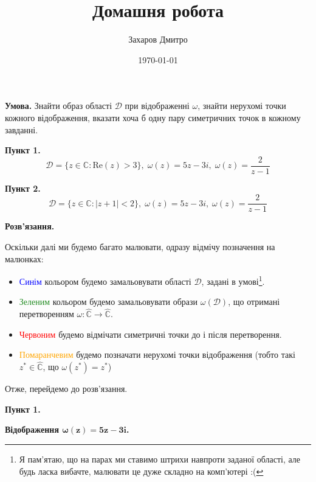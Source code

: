 \documentclass[oneside,solution]{karazin-complan-assign}
\title{Домашня робота}
\author{Захаров Дмитро}
\date{\today}
\begin{document}
\maketitle



\hspace{20px}\textbf{Умова.} Знайти образ області $\mathcal{D}$ при відображенні $\omega$, знайти нерухомі точки кожного відображення, вказати хоча б одну пару симетричних точок в кожному завданні.

\textbf{Пункт 1.}
\begin{equation*}
    \mathcal{D} = \{z \in \mathbb{C}: \text{Re}(z) > 3\}, \; \omega(z) = 5z-3i, \; \omega(z) = \frac{2}{z-1}
\end{equation*}

\textbf{Пункт 2.}
\begin{equation*}
    \mathcal{D} = \{z \in \mathbb{C}: |z+1| < 2\}, \; \omega(z) = 5z-3i, \; \omega(z) = \frac{2}{z-1}
\end{equation*}

\textbf{Розв'язання.} 

Оскільки далі ми будемо багато малювати, одразу відмічу позначення на малюнках:
\begin{itemize}
    \item \textcolor{blue}{Синім} кольором будемо замальовувати області $\mathcal{D}$, задані в умові\footnote{Я пам'ятаю, що на парах ми ставимо штрихи навпроти заданої області, але будь ласка вибачте, малювати це дуже складно на комп'ютері :(}.
    \item \textcolor{ForestGreen}{Зеленим} кольором будемо замальовувати образи $\omega(\mathcal{D})$, що отримані перетворенням $\omega: \hat{\mathbb{C}} \to \hat{\mathbb{C}}$.
    \item \textcolor{red}{Червоним} будемо відмічати симетричні точки до і після перетворення.
    \item \textcolor{orange}{Помаранчевим} будемо позначати нерухомі точки відображення (тобто такі $z^* \in \hat{\mathbb{C}}$, що $\omega(z^*) = z^*$)
\end{itemize}

Отже, перейдемо до розв'язання.
\pagebreak

\textbf{Пункт 1.} 

\textbf{Відображення $\boldsymbol{\omega(z)=5z-3i}$.} 
\end{document}
